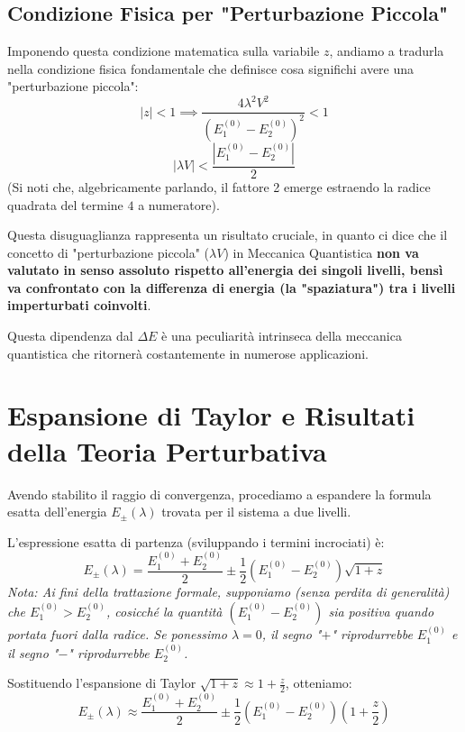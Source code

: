 \subsection{Condizione Fisica per "Perturbazione Piccola"}
Imponendo questa condizione matematica sulla variabile $z$, andiamo a tradurla nella condizione fisica fondamentale che definisce cosa significhi avere una "perturbazione piccola":
\begin{equation}
|z| < 1 \implies \frac{4\lambda^2 V^2}{(E_1^{(0)} - E_2^{(0)})^2} < 1
\end{equation}
\begin{equation}
|\lambda V| < \frac{|E_1^{(0)} - E_2^{(0)}|}{2}
\end{equation}
(Si noti che, algebricamente parlando, il fattore 2 emerge estraendo la radice quadrata del termine $4$ a numeratore).

Questa disuguaglianza rappresenta un risultato cruciale, in quanto ci dice che il concetto di "perturbazione piccola" ($\lambda V$) in Meccanica Quantistica \textbf{non va valutato in senso assoluto rispetto all'energia dei singoli livelli, bensì va confrontato con la differenza di energia (la "spaziatura") tra i livelli imperturbati coinvolti}.

Questa dipendenza dal $\Delta E$ è una peculiarità intrinseca della meccanica quantistica che ritornerà costantemente in numerose applicazioni.

\section{Espansione di Taylor e Risultati della Teoria Perturbativa}

Avendo stabilito il raggio di convergenza, procediamo a espandere la formula esatta dell'energia $E_{\pm}(\lambda)$ trovata per il sistema a due livelli.

L'espressione esatta di partenza (sviluppando i termini incrociati) è:
\begin{equation}
E_{\pm}(\lambda) = \frac{E_1^{(0)} + E_2^{(0)}}{2} \pm \frac{1}{2} (E_1^{(0)} - E_2^{(0)}) \sqrt{1 + z}
\end{equation}
\textit{Nota: Ai fini della trattazione formale, supponiamo (senza perdita di generalità) che $E_1^{(0)} > E_2^{(0)}$, cosicché la quantità $(E_1^{(0)} - E_2^{(0)})$ sia positiva quando portata fuori dalla radice. Se ponessimo $\lambda=0$, il segno "$+$" riprodurrebbe $E_1^{(0)}$ e il segno "$-$" riprodurrebbe $E_2^{(0)}$.}

Sostituendo l'espansione di Taylor $\sqrt{1+z} \approx 1 + \frac{z}{2}$, otteniamo:
\begin{equation}
E_{\pm}(\lambda) \approx \frac{E_1^{(0)} + E_2^{(0)}}{2} \pm \frac{1}{2} (E_1^{(0)} - E_2^{(0)}) \left(1 + \frac{z}{2}\right)
\end{equation}

